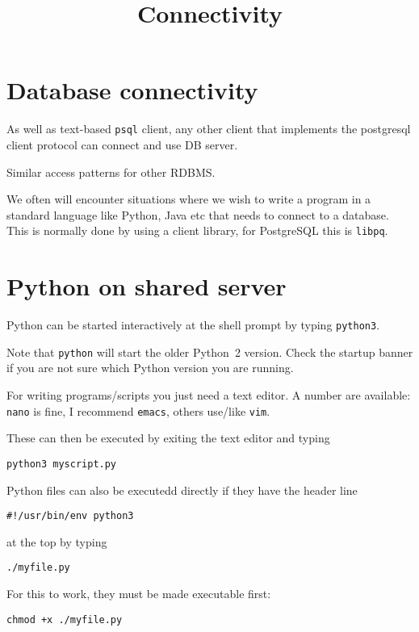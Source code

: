\documentclass{pgnotes}
\title{Connectivity}
\begin{document}
\maketitle

\section{Database connectivity}
\label{sec:database-connectivity}

As well as text-based \texttt{psql} client, any other client that
implements the postgresql client protocol can connect and use DB server.

Similar access patterns for other RDBMS.

We often will encounter situations where we wish to write a program in a standard language like Python, Java etc that needs to connect to a database.
This is normally done by using a client library, for PostgreSQL this is \texttt{libpq}.

\section{Python on shared server}
\label{sec:python-on-shared-server}

Python can be started interactively at the shell prompt by typing
\texttt{python3}.

Note that \texttt{python} will start the older Python~2 version.
Check the startup banner if you are not sure which Python version you are running.

For writing programs/scripts you just need a text editor.
A number are available: \texttt{nano} is fine, I recommend \texttt{emacs}, others use/like \texttt{vim}.

These can then be executed by exiting the text editor and typing
\begin{verbatim}
python3 myscript.py
\end{verbatim}

Python files can also be executedd directly if they have the header line
\begin{verbatim}
#!/usr/bin/env python3
\end{verbatim}
at the top by typing
\begin{verbatim}
./myfile.py
\end{verbatim}
For this to work, they must be made executable first:
\begin{verbatim}
chmod +x ./myfile.py
\end{verbatim}
\end{document}
